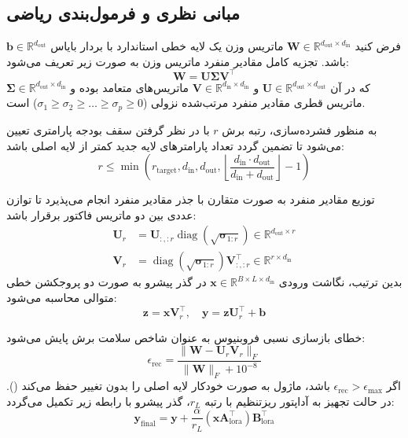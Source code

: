\subsection{مبانی نظری و فرمول‌بندی ریاضی}
فرض کنید $\mathbf{W} \in \mathbb{R}^{d_{\text{out}} \times d_{\text{in}}}$ ماتریس وزن یک لایه خطی استاندارد با بردار بایاس $\mathbf{b} \in \mathbb{R}^{d_{\text{out}}}$ باشد. تجزیه کامل مقادیر منفرد ماتریس وزن به صورت زیر تعریف می‌شود:
\begin{equation}
\mathbf{W} = \mathbf{U} \mathbf{\Sigma} \mathbf{V}^\top
\end{equation}
که در آن $\mathbf{U} \in \mathbb{R}^{d_{\text{out}} \times d_{\text{out}}}$ و $\mathbf{V} \in \mathbb{R}^{d_{\text{in}} \times d_{\text{in}}}$ ماتریس‌های متعامد بوده و $\mathbf{\Sigma} \in \mathbb{R}^{d_{\text{out}} \times d_{\text{in}}}$ ماتریس قطری مقادیر منفرد مرتب‌شده نزولی ($\sigma_1 \ge \sigma_2 \ge \dots \ge \sigma_p \ge 0$) است.

به منظور فشرده‌سازی، رتبه برش $r$ با در نظر گرفتن سقف بودجه پارامتری تعیین می‌شود تا تضمین گردد تعداد پارامترهای لایه جدید کمتر از لایه اصلی باشد:
\begin{equation}
r \le \min \left( r_{\text{target}}, d_{\text{in}}, d_{\text{out}}, \left\lfloor \frac{d_{\text{in}} \cdot d_{\text{out}}}{d_{\text{in}} + d_{\text{out}}} \right\rfloor - 1 \right)
\end{equation}

توزیع مقادیر منفرد به صورت متقارن با جذر مقادیر منفرد انجام می‌پذیرد تا توازن عددی بین دو ماتریس فاکتور برقرار باشد:
\begin{align}
\mathbf{U}_r &= \mathbf{U}_{:, :r} \operatorname{diag}(\sqrt{\mathbf{\sigma}_{1:r}}) \in \mathbb{R}^{d_{\text{out}} \times r} \\
\mathbf{V}_r &= \operatorname{diag}(\sqrt{\mathbf{\sigma}_{1:r}}) \mathbf{V}_{:, :r}^\top \in \mathbb{R}^{r \times d_{\text{in}}}
\end{align}
بدین ترتیب، نگاشت ورودی $\mathbf{x} \in \mathbb{R}^{B \times L \times d_{\text{in}}}$ در گذر پیشرو به صورت دو پروجکشن خطی متوالی محاسبه می‌شود:
\begin{equation}
\mathbf{z} = \mathbf{x} \mathbf{V}_r^\top, \quad \mathbf{y} = \mathbf{z} \mathbf{U}_r^\top + \mathbf{b}
\end{equation}

خطای بازسازی نسبی فروبنیوس به عنوان شاخص سلامت برش پایش می‌شود:
\begin{equation}
\epsilon_{\text{rec}} = \frac{\|\mathbf{W} - \mathbf{U}_r \mathbf{V}_r\|_F}{\|\mathbf{W}\|_F + 10^{-8}}
\end{equation}
اگر $\epsilon_{\text{rec}} > \epsilon_{\text{max}}$ باشد، ماژول به صورت خودکار لایه اصلی را بدون تغییر حفظ می‌کند (). در حالت تجهیز به آداپتور ریزتنظیم  با رتبه $r_L$، گذر پیشرو با رابطه زیر تکمیل می‌گردد:
\begin{equation}
\mathbf{y}_{\text{final}} = \mathbf{y} + \frac{\alpha}{r_L} (\mathbf{x} \mathbf{A}_{\text{lora}}^\top) \mathbf{B}_{\text{lora}}^\top
\end{equation}


